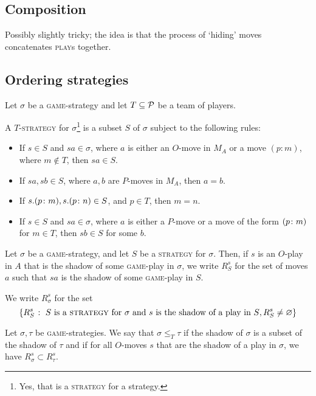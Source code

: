 \documentclass{article}
\newcommand{\game}{\textsc{game}}
\newcommand{\play}{\textsc{play}}
\newcommand{\strategy}{\textsc{strategy}}
\begin{document}
\subsection{Composition}

Possibly slightly tricky; the idea is that the process of `hiding' moves concatenates \play{}s together.

\subsection{Ordering strategies}

\begin{definition}
  Let $\sigma$ be a \game{}-strategy and let $T\subset \P$ be a team of players.

  A $T$-\strategy{} for $\sigma$\footnote{Yes, that is a \strategy{} for a strategy.} is a subset $S$ of $\sigma$ subject to the following rules:
  \begin{itemize}
    \item If $s\in S$ and $sa\in\sigma$, where $a$ is either an $O$-move in $M_A$ or a move $(p:m)$, where $m\not\in T$, then $sa\in S$.
    \item If $sa,sb\in S$, where $a,b$ are $P$-moves in $M_A$, then $a=b$.
    \item If $s.(p\from m),s.(p\from n)\in S$, and $p\in T$, then $m=n$.
    \item If $s\in S$ and $sa\in\sigma$, where $a$ is either a $P$-move or a move of the form $(p\from m)$ for $m\in T$, then $sb\in S$ for some $b$.
  \end{itemize}
\end{definition}

\begin{definition}
  Let $\sigma$ be a \game{}-strategy, and let $S$ be a \strategy{} for $\sigma$.  
  Then, if $s$ is an $O$-play in $A$ that is the shadow of some \game{}-play in $\sigma$, we write $R_S^s$ for the set of moves $a$ such that $sa$ is the shadow of some \game{}-play in $S$.

  We write $R_\sigma^s$ for the set
  \[
    \{R_S^s\suchthat \textrm{$S$ is a \strategy{} for $\sigma$ and $s$ is the shadow of a play in $S$}, R_S^s\ne\emptyset\}
    \]
\end{definition}

\begin{definition}
  Let $\sigma,\tau$ be \game{}-strategies.  
  We say that $\sigma \le_T \tau$ if the shadow of $\sigma$ is a subset of the shadow of $\tau$ and if for all $O$-moves $s$ that are the shadow of a play in $\sigma$, we have $R_\sigma^s\subset R_\tau^s$.
\end{definition}
\end{document}
